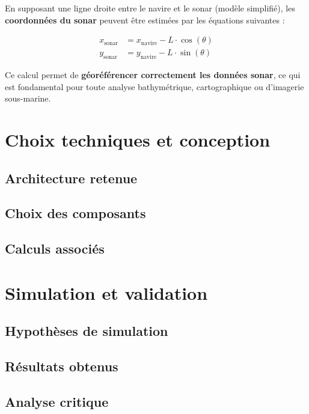 \documentclass[12pt,a4paper]{report}
\begin{document}
En supposant une ligne droite entre le navire et le sonar (modèle simplifié), les \textbf{coordonnées du sonar} peuvent être estimées par les équations suivantes :

\begin{align*}
x_{\text{sonar}} &= x_{\text{navire}} - L \cdot \cos(\theta) \\
y_{\text{sonar}} &= y_{\text{navire}} - L \cdot \sin(\theta)
\end{align*}

Ce calcul permet de \textbf{géoréférencer correctement les données sonar}, ce qui est fondamental pour toute analyse bathymétrique, cartographique ou d'imagerie sous-marine.




\section{Choix techniques et conception}

\subsection{Architecture retenue}
\subsection{Choix des composants}
\subsection{Calculs associés}





\section{Simulation et validation}

\subsection{Hypothèses de simulation}
\subsection{Résultats obtenus}
\subsection{Analyse critique}
\end{document}
